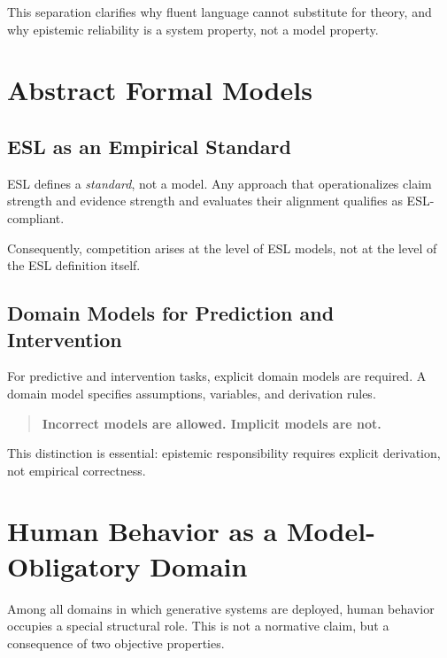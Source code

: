 \documentclass[11pt,a4paper]{article}
\begin{document}
This separation clarifies why fluent language cannot substitute for theory, and why epistemic reliability is a system property, not a model property.


\section{Abstract Formal Models}

\subsection{ESL as an Empirical Standard}

ESL defines a \emph{standard}, not a model. Any approach that operationalizes claim strength and evidence strength and evaluates their alignment qualifies as ESL-compliant.

Consequently, competition arises at the level of ESL models, not at the level of the ESL definition itself.

\subsection{Domain Models for Prediction and Intervention}

For predictive and intervention tasks, explicit domain models are required. A domain model specifies assumptions, variables, and derivation rules.

\begin{quote}
\textbf{Incorrect models are allowed. Implicit models are not.}
\end{quote}

This distinction is essential: epistemic responsibility requires explicit derivation, not empirical correctness.


\section{Human Behavior as a Model-Obligatory Domain}

Among all domains in which generative systems are deployed, human behavior occupies a special structural role. This is not a normative claim, but a consequence of two objective properties.
\end{document}
